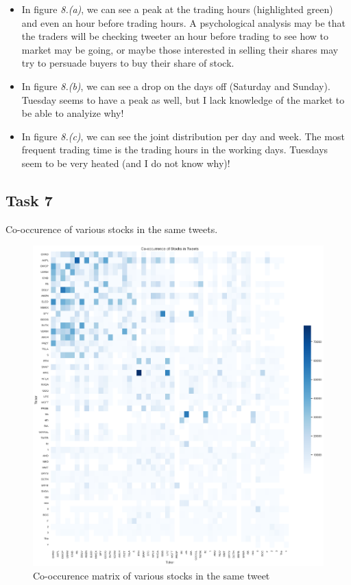 \documentclass[12pt]{article}
\begin{document}
\begin{itemize}
    \item In figure \textit{8.(a)}, we can see a peak at the trading hours 
    (highlighted green) and even an hour before trading hours. A psychological
    analysis may be that the traders will be checking tweeter an hour before trading
    to see how to market may be going, or maybe those interested in selling their shares
    may try to persuade buyers to buy their share of stock.

    \item In figure \textit{8.(b)}, we can see a drop on the days off (Saturday and Sunday).
    Tuesday seems to have a peak as well, but I lack knowledge of the
    market to be able to analyize why!

    \item In figure \textit{8.(c)}, we can see the joint distribution per day and week.
    The most frequent trading time is the trading hours in the working days.
    Tuesdays seem to be very heated (and I do not know why)!
\end{itemize}

\pagebreak

\subsection{Task 7}

\begin{qsolve}[Task]
    Co-occurence of various stocks in the same tweets.
\end{qsolve}

\begin{figure}[h!]
    \centering
    \includegraphics[width=1\textwidth]{P1.7.png}
    \caption{Co-occurence matrix of various stocks in the same tweet}
    \label{fig:1.7}
\end{figure}
\end{document}
